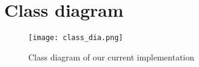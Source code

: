 \section{Class diagram}



\begin{figure}[!ht]
	\centering
	\texttt{[image: class\_dia.png]}
	\caption{Class diagram of our current implementation}
	\label{fig:length_eight_mouse}
\end{figure}
\FloatBarrier